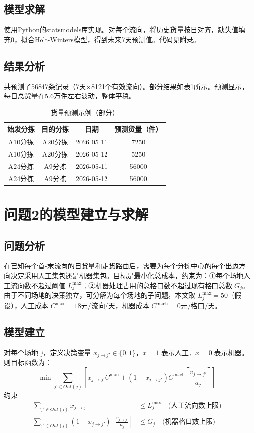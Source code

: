 \documentclass[12pt,a4paper]{ctexart}
\begin{document}
\subsection{模型求解}
使用Python的statsmodels库实现。对每个流向，将历史货量按日对齐，缺失值填充0，拟合Holt-Winters模型，得到未来7天预测值。代码见附录。

\subsection{结果分析}
共预测了56847条记录（7天×8121个有效流向）。部分结果如表\ref{tab:pred_sample}所示。预测显示，每日总货量在5.6万件左右波动，整体平稳。

\begin{table}[H]
\centering
\caption{货量预测示例（部分）}
\label{tab:pred_sample}
\begin{tabular}{cccc}
\toprule
始发分拣 & 目的分拣 & 日期 & 预测货量（件） \\
\midrule
A10分拣 & A20分拣 & 2026-05-11 & 7250 \\
A10分拣 & A20分拣 & 2026-05-12 & 5250 \\
A24分拣 & A9分拣 & 2026-05-11 & 56000 \\
A24分拣 & A9分拣 & 2026-05-12 & 56000 \\
\bottomrule
\end{tabular}
\end{table}

\section{问题2的模型建立与求解}

\subsection{问题分析}
在已知每个首-末流向的日货量和走货路由后，需要为每个分拣中心的每个出边方向决定采用人工集包还是机器集包。目标是最小化总成本，约束为：①每个场地人工流向数不超过阈值 $L_j^{\max}$；②机器处理占用的总格口数不超过现有格口总数 $G_j$。由于不同场地的决策独立，可分解为每个场地的子问题。本文取 $L_j^{\max}=50$（假设），人工成本 $C^{\text{man}}=18$元/流向/天，机器成本 $C^{\text{mach}}=0$元/格口/天。

\subsection{模型建立}
对每个场地 $j$，定义决策变量 $x_{j\to j'}\in\{0,1\}$，$x=1$ 表示人工，$x=0$ 表示机器。则目标函数为：
\[
\min \sum_{j'\in Out(j)} \left[ x_{j\to j'} C^{\text{man}} + (1-x_{j\to j'}) C^{\text{mach}} \left\lceil \frac{v_{j\to j'}}{a_j} \right\rceil \right]
\]
约束：
\begin{align}
    \sum_{j'\in Out(j)} x_{j\to j'} &\le L_j^{\max} \quad \text{(人工流向数上限)} \\
    \sum_{j'\in Out(j)} (1-x_{j\to j'}) \left\lceil \frac{v_{j\to j'}}{a_j} \right\rceil &\le G_j \quad \text{(机器格口数上限)}
\end{align}
\end{document}
